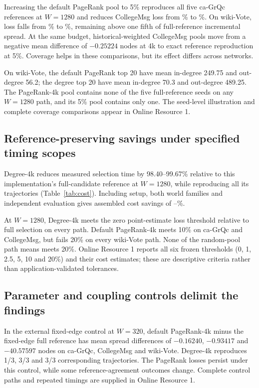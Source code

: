 \documentclass[smallextended]{svjour3}
\begin{document}
Increasing the default PageRank pool to 5\% reproduces all five ca-GrQc references at $W=1280$ and reduces CollegeMsg loss from \CollegePRLoss{}\% to \CollegePRfiveLoss{}\%. On wiki-Vote, loss falls from \WikiPRLoss{}\% to \WikiPRfiveLoss{}\%, remaining above one fifth of full-reference incremental spread. At the same budget, historical-weighted CollegeMsg pools move from a negative mean difference of $-0.25224$ nodes at 4k to exact reference reproduction at 5\%. Coverage helps in these comparisons, but its effect differs across networks.

On wiki-Vote, the default PageRank top 20 have mean in-degree 249.75 and out-degree 56.2; the degree top 20 have mean in-degree 70.3 and out-degree 489.25. The PageRank-4k pool contains none of the five full-reference seeds on any $W=1280$ path, and its 5\% pool contains only one. The seed-level illustration and complete coverage comparisons appear in Online Resource 1.

\subsection{Reference-preserving savings under specified timing scopes}
Degree-4k reduces measured selection time by 98.40--99.67\% relative to this implementation's full-candidate reference at $W=1280$, while reproducing all its trajectories (Table~\ref{tab:cost}). Including setup, both world families and independent evaluation gives assembled cost savings of \CollegeDegreeSaving{}--\WikiDegreeSaving{}\%.


At $W=1280$, Degree-4k meets the zero point-estimate loss threshold relative to full selection on every path. Default PageRank-4k meets 10\% on ca-GrQc and CollegeMsg, but fails 20\% on every wiki-Vote path. None of the random-pool path means meets 20\%. Online Resource 1 reports all six frozen thresholds (0, 1, 2.5, 5, 10 and 20\%) and their cost estimates; these are descriptive criteria rather than application-validated tolerances.

\subsection{Parameter and coupling controls delimit the findings}

In the external fixed-edge control at $W=320$, default PageRank-4k minus the fixed-edge full reference has mean spread differences of $-0.16240$, $-0.93417$ and $-40.57597$ nodes on ca-GrQc, CollegeMsg and wiki-Vote. Degree-4k reproduces 1/3, 3/3 and 3/3 corresponding trajectories. The PageRank losses persist under this control, while some reference-agreement outcomes change. Complete control paths and repeated timings are supplied in Online Resource 1.
\end{document}
